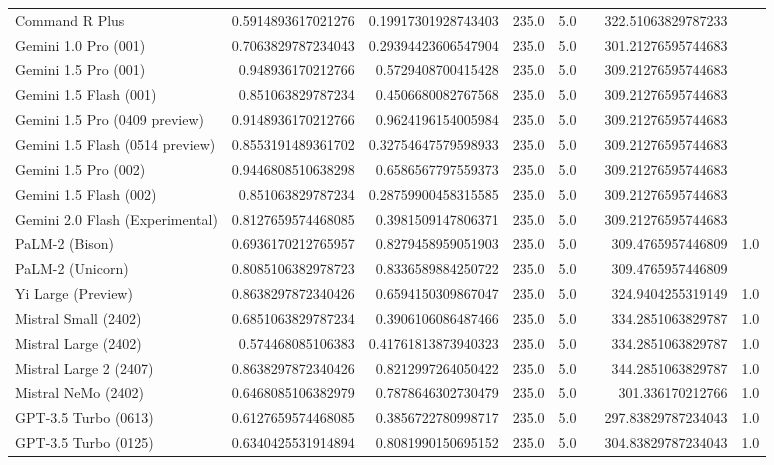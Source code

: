 \begin{table}[htp]
{\begin{tabular}{lrrrrrrr}
Command R Plus & 0.5914893617021276 & 0.19917301928743403 & 235.0 & 5.0 &  & 322.51063829787233 &  \\
Gemini 1.0 Pro (001) & 0.7063829787234043 & 0.29394423606547904 & 235.0 & 5.0 &  & 301.21276595744683 &  \\
Gemini 1.5 Pro (001) & 0.948936170212766 & 0.5729408700415428 & 235.0 & 5.0 &  & 309.21276595744683 &  \\
Gemini 1.5 Flash (001) & 0.851063829787234 & 0.4506680082767568 & 235.0 & 5.0 &  & 309.21276595744683 &  \\
Gemini 1.5 Pro (0409 preview) & 0.9148936170212766 & 0.9624196154005984 & 235.0 & 5.0 &  & 309.21276595744683 &  \\
Gemini 1.5 Flash (0514 preview) & 0.8553191489361702 & 0.32754647579598933 & 235.0 & 5.0 &  & 309.21276595744683 &  \\
Gemini 1.5 Pro (002) & 0.9446808510638298 & 0.6586567797559373 & 235.0 & 5.0 &  & 309.21276595744683 &  \\
Gemini 1.5 Flash (002) & 0.851063829787234 & 0.28759900458315585 & 235.0 & 5.0 &  & 309.21276595744683 &  \\
Gemini 2.0 Flash (Experimental) & 0.8127659574468085 & 0.3981509147806371 & 235.0 & 5.0 &  & 309.21276595744683 &  \\
PaLM-2 (Bison) & 0.6936170212765957 & 0.8279458959051903 & 235.0 & 5.0 &  & 309.4765957446809 & 1.0 \\
PaLM-2 (Unicorn) & 0.8085106382978723 & 0.8336589884250722 & 235.0 & 5.0 &  & 309.4765957446809 &  \\
Yi Large (Preview) & 0.8638297872340426 & 0.6594150309867047 & 235.0 & 5.0 &  & 324.9404255319149 & 1.0 \\
Mistral Small (2402) & 0.6851063829787234 & 0.3906106086487466 & 235.0 & 5.0 &  & 334.2851063829787 & 1.0 \\
Mistral Large (2402) & 0.574468085106383 & 0.41761813873940323 & 235.0 & 5.0 &  & 334.2851063829787 & 1.0 \\
Mistral Large 2 (2407) & 0.8638297872340426 & 0.8212997264050422 & 235.0 & 5.0 &  & 344.2851063829787 & 1.0 \\
Mistral NeMo (2402) & 0.6468085106382979 & 0.7878646302730479 & 235.0 & 5.0 &  & 301.336170212766 & 1.0 \\
GPT-3.5 Turbo (0613) & 0.6127659574468085 & 0.3856722780998717 & 235.0 & 5.0 &  & 297.83829787234043 & 1.0 \\
GPT-3.5 Turbo (0125) & 0.6340425531914894 & 0.8081990150695152 & 235.0 & 5.0 &  & 304.83829787234043 & 1.0 \\

\end{tabular}}
\end{table}
